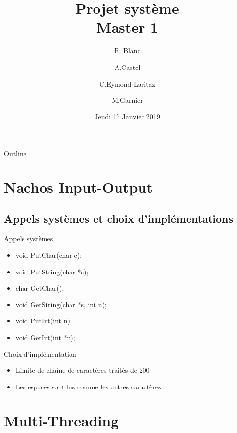 \documentclass{beamer}
\title{Projet système\\Master 1}
\author{R. Blanc \and A.Castel \and C.Eymond Laritaz \and M.Garnier}
\institute[Université Grenoble-Alpes] %
{
  UFR IM²AG\\
  Université Grenoble-Alpes
}
\date{Jeudi 17 Janvier 2019}
\begin{document}
\begin{frame}
  \titlepage
\end{frame}

\begin{frame}{Outline}
  \tableofcontents%
\end{frame}


\section{Nachos Input-Output}
\subsection{Appels systèmes et choix d’implémentations }
\begin{frame}
	\begin{block}{Appels systèmes}
		\begin{itemize}
			\item void PutChar(char c);
			\item void PutString(char *s);
			\item char GetChar();
			\item void GetString(char *s, int n);
			\item void PutInt(int n);
			\item void GetInt(int *n);
		\end{itemize}
	\end{block}
	\begin{block}{Choix d’implémentation}
		\begin{itemize}
			\item Limite de chaîne de caractères traités de 200
			\item Les espaces sont lus comme les autres caractères 
		\end{itemize}		
	\end{block}
\end{frame}







\section{Multi-Threading}
\end{document}
